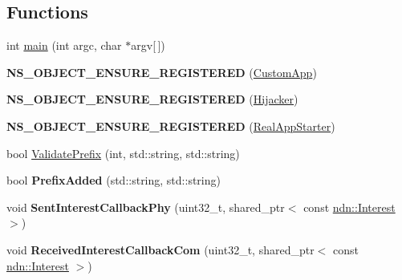 \subsection*{Functions}
\begin{DoxyCompactItemize}
\item 
int \hyperlink{namespacens3_a11d2b7457dda0c471b957d8216132f4e}{main} (int argc, char $\ast$argv\mbox{[}$\,$\mbox{]})
\item 
{\bfseries N\+S\+\_\+\+O\+B\+J\+E\+C\+T\+\_\+\+E\+N\+S\+U\+R\+E\+\_\+\+R\+E\+G\+I\+S\+T\+E\+R\+ED} (\hyperlink{classns3_1_1CustomApp}{Custom\+App})\hypertarget{namespacens3_a1d0470bad8c7659ab713f00ebbc3689a}{}\label{namespacens3_a1d0470bad8c7659ab713f00ebbc3689a}

\item 
{\bfseries N\+S\+\_\+\+O\+B\+J\+E\+C\+T\+\_\+\+E\+N\+S\+U\+R\+E\+\_\+\+R\+E\+G\+I\+S\+T\+E\+R\+ED} (\hyperlink{classns3_1_1Hijacker}{Hijacker})\hypertarget{namespacens3_ad199b4ea5291c484b7ff7258a0ebb6bb}{}\label{namespacens3_ad199b4ea5291c484b7ff7258a0ebb6bb}

\item 
{\bfseries N\+S\+\_\+\+O\+B\+J\+E\+C\+T\+\_\+\+E\+N\+S\+U\+R\+E\+\_\+\+R\+E\+G\+I\+S\+T\+E\+R\+ED} (\hyperlink{classns3_1_1RealAppStarter}{Real\+App\+Starter})\hypertarget{namespacens3_a4d988cdfd16a2755094d987b1867dabe}{}\label{namespacens3_a4d988cdfd16a2755094d987b1867dabe}

\item 
bool \hyperlink{namespacens3_a476c8d1f7445caf7372d7fd2366a48a1}{Validate\+Prefix} (int, std\+::string, std\+::string)
\item 
bool {\bfseries Prefix\+Added} (std\+::string, std\+::string)\hypertarget{namespacens3_ab8702fd5e4ae318696f3b6fafbd62100}{}\label{namespacens3_ab8702fd5e4ae318696f3b6fafbd62100}

\item 
void {\bfseries Sent\+Interest\+Callback\+Phy} (uint32\+\_\+t, shared\+\_\+ptr$<$ const \hyperlink{classndn_1_1Interest}{ndn\+::\+Interest} $>$)\hypertarget{namespacens3_a20e6957af9e34afef03f7c4e3d1a66ef}{}\label{namespacens3_a20e6957af9e34afef03f7c4e3d1a66ef}

\item 
void {\bfseries Received\+Interest\+Callback\+Com} (uint32\+\_\+t, shared\+\_\+ptr$<$ const \hyperlink{classndn_1_1Interest}{ndn\+::\+Interest} $>$)\hypertarget{namespacens3_ae4ce5cb5813ac7bd8f13cf1eee385b1b}{}\label{namespacens3_ae4ce5cb5813ac7bd8f13cf1eee385b1b}


\end{DoxyCompactItemize}
